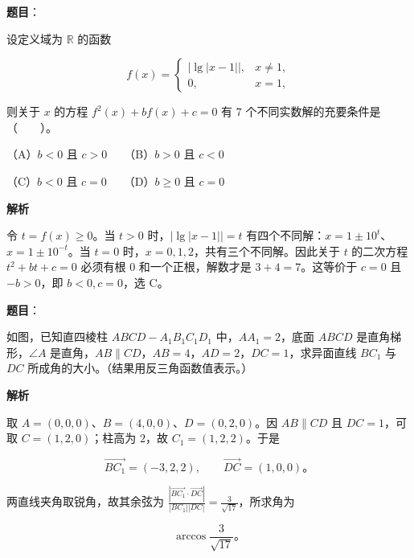 \begin{answer}

\textbf{题目}：

设定义域为 $\mathbb R$ 的函数

\nopagebreak[4]
\[
f(x)=
\begin{cases}
|\lg|x-1||, & x\ne1,\\
0, & x=1,
\end{cases}
\]

则关于 $x$ 的方程 $f^2(x)+bf(x)+c=0$ 有 $7$ 个不同实数解的充要条件是\mbox{（　　）}。

（A）$b<0$ 且 $c>0$　　（B）$b>0$ 且 $c<0$

（C）$b<0$ 且 $c=0$　　（D）$b\geqslant0$ 且 $c=0$

\textbf{解析}

令 $t=f(x)\ge0$。当 $t>0$ 时，$|\lg|x-1||=t$ 有四个不同解：$x=1\pm10^t$、$x=1\pm10^{-t}$。当 $t=0$ 时，$x=0,1,2$，共有三个不同解。因此关于 $t$ 的二次方程 $t^2+bt+c=0$ 必须有根 $0$ 和一个正根，解数才是 $3+4=7$。这等价于 $c=0$ 且 $-b>0$，即 $b<0,c=0$，选 C。


\end{answer}
\begin{answer}

\textbf{题目}：

如图，已知直四棱柱 $ABCD-A_1B_1C_1D_1$ 中，$AA_1=2$，底面 $ABCD$ 是直角梯形，$\angle A$ 是直角，$AB\parallel CD$，$AB=4$，$AD=2$，$DC=1$，求异面直线 $BC_1$ 与 $DC$ 所成角的大小。（结果用反三角函数值表示。）
\nopagebreak[4]
\begin{center}\end{center}
\nopagebreak[4]
\textbf{解析}

取 $A=(0,0,0)$、$B=(4,0,0)$、$D=(0,2,0)$。因 $AB\parallel CD$ 且 $DC=1$，可取 $C=(1,2,0)$；柱高为 $2$，故 $C_1=(1,2,2)$。于是

\nopagebreak[4]
\[
\overrightarrow{BC_1}=(-3,2,2),\qquad \overrightarrow{DC}=(1,0,0)\mbox{。}
\]

两直线夹角取锐角，故其余弦为 $\frac{|\overrightarrow{BC_1}\cdot\overrightarrow{DC}|}{|BC_1||DC|}=\frac3{\sqrt{17}}$，所求角为

\nopagebreak[4]
\[
\arccos\frac3{\sqrt{17}}\mbox{。}
\]


\end{answer}
